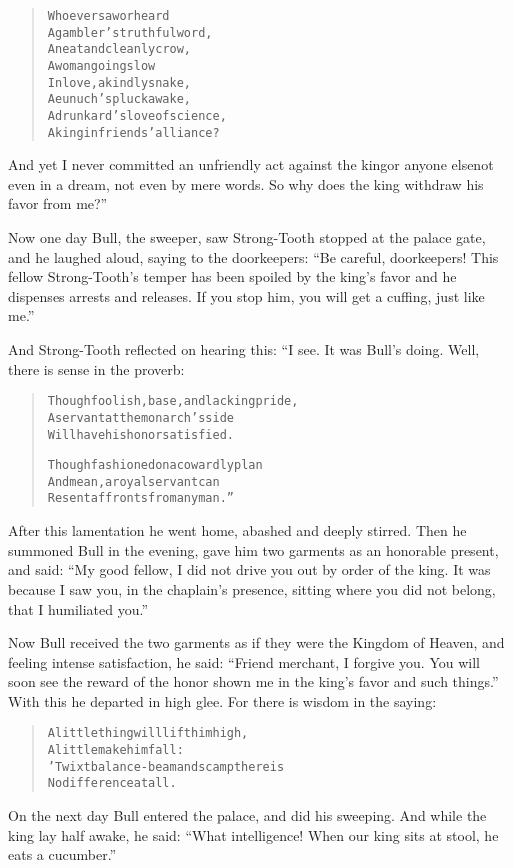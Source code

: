 \documentclass[article, twoside, 14pt]{memoir}
\renewenvironment{verbatim}{%
\begin{quote}%
\vskip -10pt%
\begin{alltt}\normalfont\large}{\end{alltt}%
\end{quote}%
\vskip -10pt
} %
\begin{document}
\begin{verbatim}
Who ever saw or heard
A gambler's truthful word,
A neat and cleanly crow,
A woman going slow
In love, a kindly snake,
A eunuch's pluck awake,
A drunkard's love of science,
A king in friends' alliance?
\end{verbatim}
And yet I never committed an unfriendly act against the king{\textemdash}or
anyone else{\textemdash}not even in a dream, not even by mere words. So why
does the king withdraw his favor from me?”

Now one day Bull, the sweeper, saw Strong-Tooth stopped at the
palace gate, and he laughed aloud, saying to the doorkeepers:
``Be careful, doorkeepers! This fellow Strong-Tooth's temper has been spoiled by the king's favor and he dispenses arrests and releases. If you stop him, you will get a cuffing, just like me.''


And Strong-Tooth reflected on hearing this: “I see. It was Bull's
doing. Well, there is sense in the proverb:

\begin{verbatim}
Though foolish, base, and lacking pride,
A servant at the monarch's side
Will have his honor satisfied.

Though fashioned on a cowardly plan
And mean, a royal servant can
Resent affronts from any man.”
\end{verbatim}
After this lamentation he went home, abashed and deeply stirred.
Then he summoned Bull in the evening, gave him two garments as an
honorable present, and said:
``My good fellow, I did not drive you out by order of the king. It was because I saw you, in the chaplain's presence, sitting where you did not belong, that I humiliated you.''

Now Bull received the two garments as if they were the Kingdom of
Heaven, and feeling intense satisfaction, he said:
``Friend merchant, I forgive you. You will soon see the reward of the honor shown me in the king's favor and such things.''
With this he departed in high glee. For there is wisdom in the
saying:

\begin{verbatim}
A little thing will lift him high,
    A little make him fall:
'Twixt balance-beam and scamp there is
    No difference at all.
\end{verbatim}
On the next day Bull entered the palace, and did his sweeping. And
while the king lay half awake, he said:
``What intelligence! When our king sits at stool, he eats a cucumber.''
\end{document}
